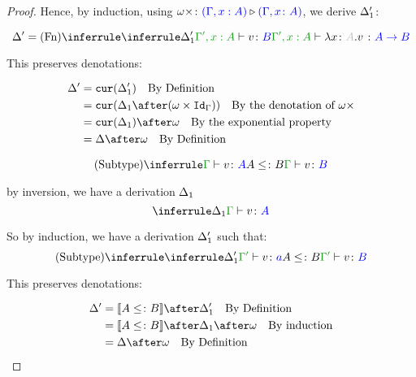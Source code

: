 \documentclass{report}
\begin{document}
\begin{framed}
\begin{proof}
        Hence, by induction, using $\omega\times \colon {\color{blue}(\Gamma,x:  A)} \triangleright {\color {blue} (\Gamma, x\colon A)}$, we derive $\Delta_1'$:
        
        \begin{equation}
            \D' = \ntreeruleI{Fn}{
                \treeruleI{\D_1'}{\typerelation{\G',x: A}{v}{B}}
            }{\typerelation{\G',x: A}{\lam{x}{A}{v}}{\ab}}
        \end{equation}
        
        This preserves denotations:
        
        
        \begin{align*}
        \D' & = \cur{\D_1'} \qt{By Definition}\\
        & = \cur{\D_1\after(\w\times \idg)}\qt{By the denotation of $\w\x$} \\
        &= \cur{\D_1}\after\w\qt{By the exponential property}\\
        &= \D\after \w \qt{By Definition}
        \end{align*}
        
        
        
        \begin{equation}
            \ntreeruleII{Subtype}{\gtyperelation{v}{A}}{ A\subtype B}{\gtyperelation{v}{B}}
        \end{equation}
        
        by inversion, we have a derivation $\Delta_1$
        \begin{equation}
            \treeruleI{\D_1}{\gtyperelation{v}{A}}
        \end{equation}
        
        So by induction, we have a derivation $\Delta_1'$ such that:
        \begin{equation}
            \ntreeruleII{Subtype}{\treeruleI{\D_1'}{\typerelation{\G'}{v}{a}}}{ A \subtype B}{\typerelation{\G'}{v}{B}}
        \end{equation}
        
        This preserves denotations:
        
        \begin{align*}
            \D' & = \deno{A\subtype B}\after \D_1' \qt{By Definition} \\
            & = \deno{A\subtype B}\after \D_1\after\w \qt{By induction}\\
            & = \D\after\w \qt{By Definition}\\
        \end{align*}
        

\end{proof}
\end{framed}
\end{document}
